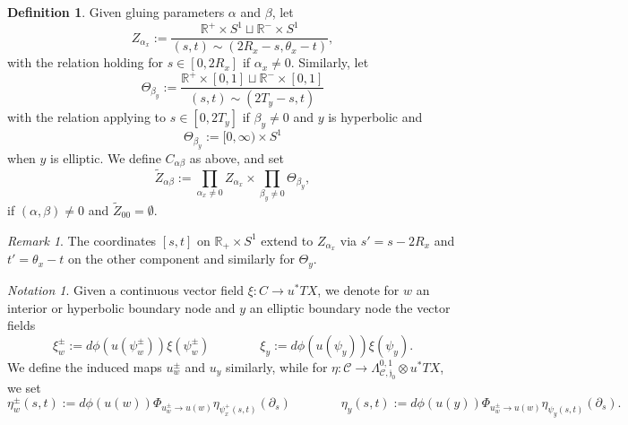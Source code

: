 \documentclass[11pt,psamsfonts, oneside, reqno]{amsart}
\newcommand{\p}[2]{\prod\limits_{#1}{#2} }
\newcommand{\cl}{\colon}
\newcommand{\emst}{\emptyset}
\newcommand{\scC}{\mathscr{C}}
\newcommand{\del}{\partial}
\newcommand{\bR}{\mathbb{R}}
\newcommand{\fj}{\mathfrak{j}}
\newcommand{\wt}{\widetilde}
\theoremstyle{definition}
\newtheorem{definition}[theorem]{Definition}
\theoremstyle{remark}
\newtheorem{remark}[theorem]{Remark}
\newtheorem*{notation*}{Notation}
\numberwithin{equation}{section}
\begin{document}
\begin{definition}\label{de:glued-spaces}
	Given gluing parameters $\alpha$ and $\beta$, let 
	$$Z_{\alpha_x} := \frac{\bR^+\times S^1 \sqcup \bR^-\times S^1}{(s,t)\sim (2R_x-s,\theta_x-t)},$$\noindent
	with the relation holding for $s \in [0,2R_x]$ if $\alpha_x \neq 0$. Similarly, let 
	$$\Theta_{\beta_y} := \frac{\bR^+\times [0,1] \sqcup \bR^-\times [0,1]}{(s,t)\sim (2T_y-s,t)}$$\noindent
	with the relation applying to $s \in [0,2T_y]$ if $\beta_y \neq 0$ and $y$ is hyperbolic and 
	$$\Theta_{\beta_y} :=  [0,\infty)\times S^1$$\noindent
	when $y$ is elliptic. 
	We define $C_{\alpha\beta}$ as above, and set
	$$\wt Z_{\alpha\beta}:=  \p{\alpha_x \neq 0}{Z_{\alpha_x}}\times\p{\beta_y \neq 0}{\Theta_{\beta_y}},$$\noindent
	if $(\alpha,\beta)\neq 0$ and $ \wt Z_{00} = \emst$.
\end{definition}

\begin{remark}\label{}The coordinates $[s,t]$ on $\bR_+\times S^1$ extend to $Z_{\alpha_x}$ via $s' = s-2R_x$ and $t' = \theta_x-t$ on the other component and similarly for $\Theta_y$.
 \end{remark}

\begin{notation*} Given a continuous vector field $\xi \cl C\to u^*TX$, we denote for $w$ an interior or hyperbolic boundary node and $y$ an elliptic boundary node the vector fields
$$\xi^\pm_w := d\phi(u(\psi_w^\pm))\xi(\psi_w^\pm) \qquad \qquad \xi_y := d\phi(u(\psi_y))\xi(\psi_y).$$\noindent
We define the induced maps $u_w^\pm$ and $u_y$ similarly, while for $\eta \cl \scC\to \Lambda^{0,1}_{\scC,\fj_0}\otimes u^*TX$, we set
$$\eta_w^\pm(s,t) := d\phi(u(w))\Phi_{u^\pm_w\to u(w)}\eta_{\psi_x^+(s,t)}(\del_s)\qquad \qquad \eta_y(s,t) := d\phi(u(y))\Phi_{u^\pm_w\to u(w)}\eta_{\psi_y(s,t)}(\del_s).$$\noindent
\end{notation*}
\end{document}
